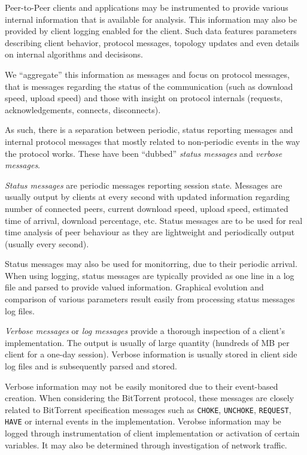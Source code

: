 Peer-to-Peer clients and applications may be instrumented to provide various
internal information that is available for analysis. This information may also
be provided by client logging enabled for the client. Such data features
parameters describing client behavior, protocol messages, topology updates and
even details on internal algorithms and decisisons.

We ``aggregate'' this information as messages and focus on protocol messages,
that is messages regarding the status of the communication (such as download
speed, upload speed) and those with insight on protocol internals
(requests, acknowledgements, connects, disconnects).

As such, there is a separation between periodic, status reporting messages and
internal protocol messages that mostly related to non-periodic events in the
way the protocol works. These have been ``dubbed'' \textit{status messages}
and \textit{verbose messages}.

\textit{Status messages} are periodic messages reporting session state.
Messages are usually output by clients at every second with updated
information regarding number of connected peers, current download speed,
upload speed, estimated time of arrival, download percentage, etc. Status
messages are to be used for real time analysis of peer behaviour as they are
lightweight and periodically output (usually every second).

Status messages may also be used for monitorring, due to their periodic
arrival. When using logging, status messages are typically provided as one
line in a log file and parsed to provide valued information. Graphical
evolution and comparison of various parameters result easily from processing
status messages log files.

\textit{Verbose messages} or \textit{log messages} provide a thorough
inspection of a client's implementation. The output is usually of large
quantity (hundreds of MB per client for a one-day session). Verbose
information is usually stored in client side log files and is subsequently
parsed and stored.

Verbose information may not be easily monitored due to their event-based
creation. When considering the BitTorrent protocol, these messages are
closely related to BitTorrent specification messages such as \texttt{CHOKE},
\texttt{UNCHOKE}, \texttt{REQUEST}, \texttt{HAVE} or internal events in the
implementation. Verobse information may be logged through instrumentation of
client implementation or activation of certain variables. It may also be
determined through investigation of network traffic.

